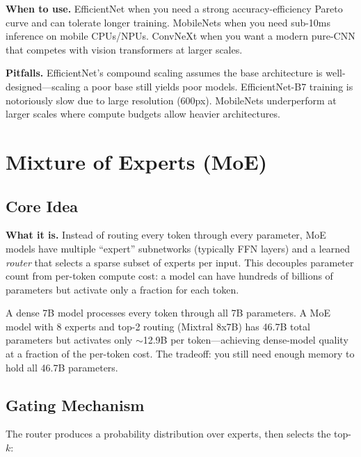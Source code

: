 \textbf{When to use.} EfficientNet when you need a strong accuracy-efficiency Pareto curve and can tolerate longer training. MobileNets when you need sub-10ms inference on mobile CPUs/NPUs. ConvNeXt when you want a modern pure-CNN that competes with vision transformers at larger scales.

\textbf{Pitfalls.} EfficientNet's compound scaling assumes the base architecture is well-designed---scaling a poor base still yields poor models. EfficientNet-B7 training is notoriously slow due to large resolution (600px). MobileNets underperform at larger scales where compute budgets allow heavier architectures.

\section{Mixture of Experts (MoE)}
\label{sec:moe}

\subsection{Core Idea}

\textbf{What it is.} Instead of routing every token through every parameter, MoE models have multiple ``expert'' subnetworks (typically FFN layers) and a learned \textit{router} that selects a sparse subset of experts per input. This decouples parameter count from per-token compute cost: a model can have hundreds of billions of parameters but activate only a fraction for each token.

\begin{keyinsight}
A dense 7B model processes every token through all 7B parameters. A MoE model with 8 experts and top-2 routing (Mixtral 8x7B) has 46.7B total parameters but activates only $\sim$12.9B per token---achieving dense-model quality at a fraction of the per-token cost. The tradeoff: you still need enough memory to hold all 46.7B parameters.
\end{keyinsight}

\subsection{Gating Mechanism}

The router produces a probability distribution over experts, then selects the top-$k$:

